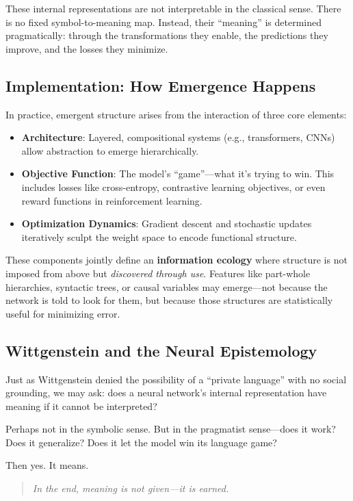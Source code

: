 These internal representations are not interpretable in the classical sense. There is no fixed symbol-to-meaning map. Instead, their ``meaning'' is determined pragmatically: through the transformations they enable, the predictions they improve, and the losses they minimize.

\subsection{Implementation: How Emergence Happens}

In practice, emergent structure arises from the interaction of three core elements:

\begin{itemize}
    \item \textbf{Architecture}: Layered, compositional systems (e.g., transformers, CNNs) allow abstraction to emerge hierarchically.
    \item \textbf{Objective Function}: The model’s ``game''—what it’s trying to win. This includes losses like cross-entropy, contrastive learning objectives, or even reward functions in reinforcement learning.
    \item \textbf{Optimization Dynamics}: Gradient descent and stochastic updates iteratively sculpt the weight space to encode functional structure.
\end{itemize}

These components jointly define an \textbf{information ecology} where structure is not imposed from above but \emph{discovered through use}. Features like part-whole hierarchies, syntactic trees, or causal variables may emerge—not because the network is told to look for them, but because those structures are statistically useful for minimizing error.

\subsection{Wittgenstein and the Neural Epistemology}

Just as Wittgenstein denied the possibility of a ``private language'' with no social grounding, we may ask: does a neural network's internal representation have meaning if it cannot be interpreted?

Perhaps not in the symbolic sense. But in the pragmatist sense—does it work? Does it generalize? Does it let the model win its language game?

Then yes. It means.

\vspace{0.5em}
\begin{quote}
    \emph{In the end, meaning is not given—it is earned.}
\end{quote}














